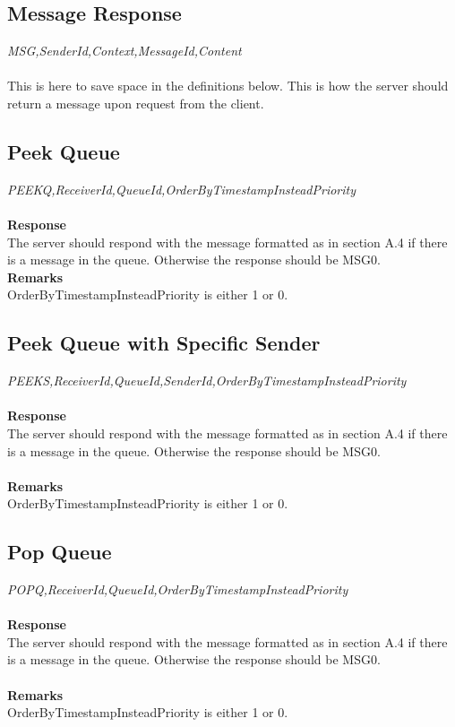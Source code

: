 \documentclass{article}
\begin{document}
            \subsection{Message Response}
                \indent\indent\textit{MSG,SenderId,Context,MessageId,Content}\\
                \\
                This is here to save space in the definitions below. This is how the server should return a message upon request from the client.

            \subsection{Peek Queue}
                \indent\indent \textit{PEEKQ,ReceiverId,QueueId,OrderByTimestampInsteadPriority}\\
                \\
                \textbf{Response}\\
                The server should respond with the message formatted as in section A.4 if there is a message in the queue. Otherwise the response should be MSG0.\\
                \textbf{Remarks}\\
                OrderByTimestampInsteadPriority is either 1 or 0.

            \subsection{Peek Queue with Specific Sender}
                \indent\indent\textit{PEEKS,ReceiverId,QueueId,SenderId,OrderByTimestampInsteadPriority}\\
            \\
            \textbf{Response}\\
            The server should respond with the message formatted as in section A.4 if there is a message in the queue. Otherwise the response should be MSG0.\\
            \\
            \textbf{Remarks}\\
            OrderByTimestampInsteadPriority is either 1 or 0.


            \subsection{Pop Queue}
                \indent\indent\textit{POPQ,ReceiverId,QueueId,OrderByTimestampInsteadPriority}\\
                \\
                \textbf{Response}\\
                The server should respond with the message formatted as in section A.4 if there is a message in the queue. Otherwise the response should be MSG0.\\
                \\
                \textbf{Remarks}\\
                OrderByTimestampInsteadPriority is either 1 or 0.
\end{document}

